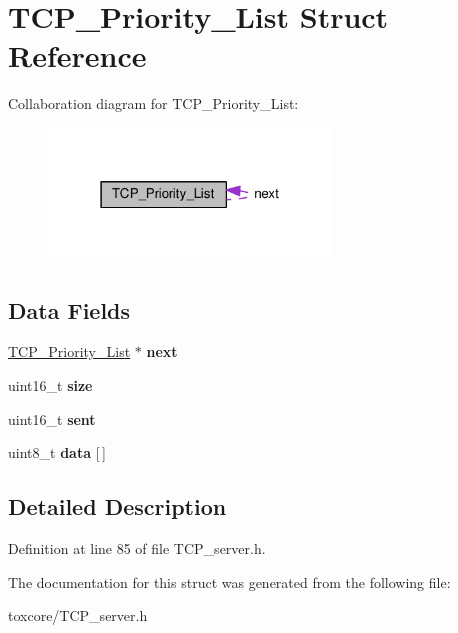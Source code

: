 \hypertarget{struct_t_c_p___priority___list}{\section{T\+C\+P\+\_\+\+Priority\+\_\+\+List Struct Reference}
\label{struct_t_c_p___priority___list}
}


Collaboration diagram for T\+C\+P\+\_\+\+Priority\+\_\+\+List\+:\nopagebreak
\begin{figure}[H]
\begin{center}
\leavevmode
\includegraphics[width=214pt]{struct_t_c_p___priority___list__coll__graph}
\end{center}
\end{figure}
\subsection*{Data Fields}
\begin{DoxyCompactItemize}
\item 
\hypertarget{struct_t_c_p___priority___list_ac4565314423a94bcf735245b8b9b4c53}{\hyperlink{struct_t_c_p___priority___list}{T\+C\+P\+\_\+\+Priority\+\_\+\+List} $\ast$ {\bfseries next}}\label{struct_t_c_p___priority___list_ac4565314423a94bcf735245b8b9b4c53}

\item 
\hypertarget{struct_t_c_p___priority___list_aaba88b24a21a6c70c895c0d55f4a69a0}{uint16\+\_\+t {\bfseries size}}\label{struct_t_c_p___priority___list_aaba88b24a21a6c70c895c0d55f4a69a0}

\item 
\hypertarget{struct_t_c_p___priority___list_a61e6f322b3c26ac891710463676b5185}{uint16\+\_\+t {\bfseries sent}}\label{struct_t_c_p___priority___list_a61e6f322b3c26ac891710463676b5185}

\item 
\hypertarget{struct_t_c_p___priority___list_a5c239a1bb87b52b0f1d6d68c4749cd2a}{uint8\+\_\+t {\bfseries data} \mbox{[}$\,$\mbox{]}}\label{struct_t_c_p___priority___list_a5c239a1bb87b52b0f1d6d68c4749cd2a}

\end{DoxyCompactItemize}


\subsection{Detailed Description}


Definition at line 85 of file T\+C\+P\+\_\+server.\+h.



The documentation for this struct was generated from the following file\+:\begin{DoxyCompactItemize}
\item 
toxcore/T\+C\+P\+\_\+server.\+h\end{DoxyCompactItemize}
